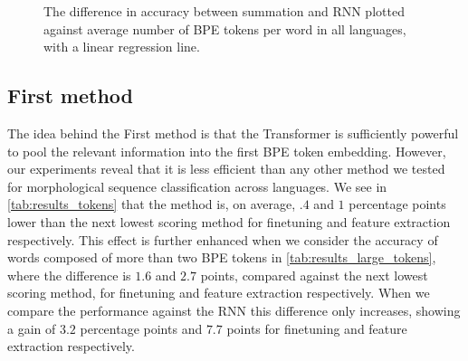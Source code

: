 \documentclass[11pt]{article}
\begin{document}
\begin{figure}
        \caption{The difference in accuracy between summation and RNN plotted against average number of BPE
     tokens per word in all languages, with a linear regression line.}
    \label{fig:scatter_len}
    \end{figure}

    \subsection{First method}

            The idea behind the First method is that the Transformer is
     sufficiently powerful to pool the relevant information into the
     first BPE token embedding.
                            However, our experiments reveal that it is
     less efficient than any other method we tested for morphological
     sequence classification across languages. We see in
     \cref{tab:results_tokens} that the method is, on average, $.4$
     and $1$ percentage points lower than the next lowest scoring
     method for finetuning and feature extraction respectively.
             This effect is further enhanced when we consider the
     accuracy of words composed of more than two BPE tokens in
     \cref{tab:results_large_tokens}, where the difference is $1.6$
     and $2.7$ points, compared against the next lowest scoring
     method, for finetuning and feature extraction respectively. When
     we compare the performance against the RNN this difference only
     increases, showing a gain of $3.2$ percentage points and $7.7$
     points for finetuning and feature extraction respectively.
\end{document}
